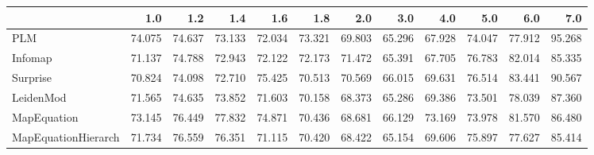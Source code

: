 \begin{tabular}{lrrrrrrrrrrr}
\toprule
{} &    1.0 &    1.2 &    1.4 &    1.6 &    1.8 &    2.0 &    3.0 &    4.0 &    5.0 &    6.0 &    7.0 \\
\midrule
PLM                 & 74.075 & 74.637 & 73.133 & 72.034 & 73.321 & 69.803 & 65.296 & 67.928 & 74.047 & 77.912 & 95.268 \\
Infomap             & 71.137 & 74.788 & 72.943 & 72.122 & 72.173 & 71.472 & 65.391 & 67.705 & 76.783 & 82.014 & 85.335 \\
Surprise            & 70.824 & 74.098 & 72.710 & 75.425 & 70.513 & 70.569 & 66.015 & 69.631 & 76.514 & 83.441 & 90.567 \\
LeidenMod           & 71.565 & 74.635 & 73.852 & 71.603 & 70.158 & 68.373 & 65.286 & 69.386 & 73.501 & 78.039 & 87.360 \\
MapEquation         & 73.145 & 76.449 & 77.832 & 74.871 & 70.436 & 68.681 & 66.129 & 73.169 & 73.978 & 81.570 & 86.480 \\
MapEquationHierarch & 71.734 & 76.559 & 76.351 & 71.115 & 70.420 & 68.422 & 65.154 & 69.606 & 75.897 & 77.627 & 85.414 \\
\bottomrule
\end{tabular}
